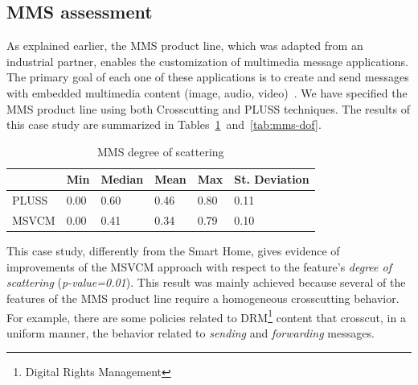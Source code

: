 \documentclass{sig-alternate}
\begin{document}



\subsection{MMS assessment}

As explained earlier, the MMS product line, which was adapted from an industrial
partner, enables the customization of multimedia message applications. The
primary goal of each one of these applications is to create and send messages
with embedded multimedia content (image, audio, video)~\cite{Bonifacio:2008aa}.
We have specified the MMS product line using both Crosscutting and PLUSS
techniques. The results of this case study are
summarized in Tables~\ref{tab:mms-dos}~and~\ref{tab:mms-dof}.

\begin{table}[htb] \centering
\caption{MMS degree of scattering}
\label{tab:mms-dos}
\begin{small}
\begin{tabular}{llllll} \hline
					& Min 	& Median 	& Mean 	& Max 	& St. Deviation \\ \hline 
	PLUSS			& 0.00  & 0.60   	& 0.46  & 0.80 	& 0.11 			\\
	MSVCM			& 0.00  & 0.41   	& 0.34 	& 0.79 	& 0.10			\\ \hline	
\end{tabular}
\end{small}
\end{table}

This case study, differently from the Smart Home, gives evidence of improvements of the
MSVCM approach with respect to the feature's \emph{degree of scattering}
(\emph{p-value=0.01}). This result was mainly achieved because several of the features of
the MMS product line require a homogeneous crosscutting behavior. For example,
there are some policies related to DRM\footnote{Digital Rights Management}
content that crosscut, in a uniform manner, the behavior related to
\emph{sending} and \emph{forwarding} messages.
\end{document}
